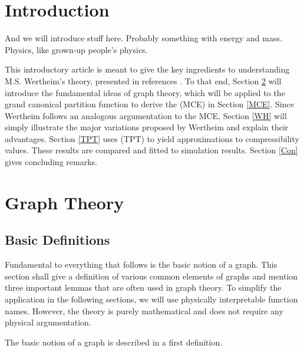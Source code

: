 \documentclass[8.5pt,twoside,twocolumn]{article}
\theoremstyle{standard}
\begin{document}
\section{Introduction}
And we will introduce stuff here. Probably something with energy and mass. Physics, like grown-up people's physics.

This introductory article is meant to give the key ingredients to understanding M.S. Wertheim's theory, presented in
references \cite{Wertheim1}\cite{Wertheim2}\cite{Wertheim3}\cite{Wertheim4}\cite{WertheimTPT}. To that end, Section \ref{GrT}
will introduce the fundamental ideas of graph theory, which will be applied to the grand canonical partition function
to derive the  (MCE) in Section \ref{MCE}. Since Wertheim follows an analogous argumentation to the
MCE, Section \ref{WH} will simply illustrate the major variations proposed by Wertheim and explain their advantages. Section
\ref{TPT} uses  (TPT) to yield approximations to compressibility values. These results are
compared and fitted to simulation results. Section \ref{Con} gives concluding remarks.




\section{Graph Theory}
\label{GrT}
\subsection{Basic Definitions}
Fundamental to everything that follows is the basic notion of a graph. This section shall give a definition of various
common elements of graphs and mention three important lemmas that are often used in graph theory. To simplify the
application in the following sections, we will use physically interpretable function names. However, the theory
is purely mathematical and does not require any physical argumentation.

The basic notion of a graph is described in a first definition.
\end{document}
